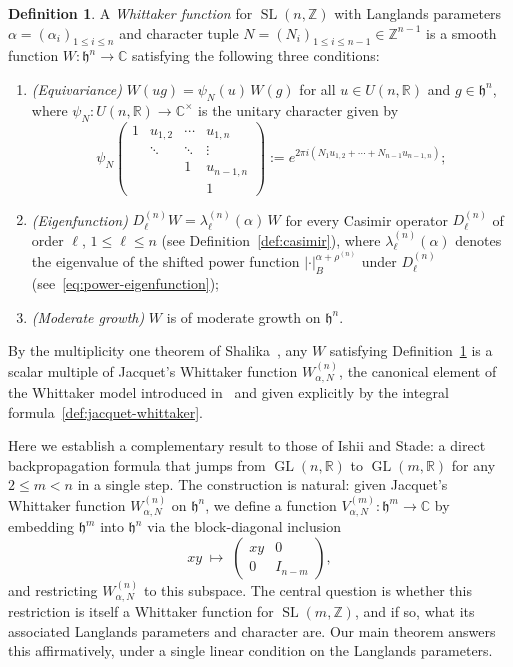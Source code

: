 \documentclass[12pt, reqno, oneside]{amsart}
\theoremstyle{definition}
\newtheorem{definition}[theorem]{Definition}
\numberwithin{equation}{section}
\newcommand{\Z}{\mathbb{Z}}
\newcommand{\R}{\mathbb{R}}
\newcommand{\C}{\mathbb{C}}
\newcommand{\hh}{\mathfrak{h}}
\DeclareMathOperator{\GL}{GL}
\DeclareMathOperator{\SL}{SL}
\begin{document}
\begin{definition}\label{def:whittaker-intro}
A \emph{Whittaker function} for
$\SL(n,\Z)$ with Langlands parameters $\alpha = (\alpha_i)_{1\leq i\leq
n}$ and character tuple $N=(N_i)_{1\leq i\leq n-1}\in\Z^{n-1}$ is a
smooth function $W:\hh^n\to\C$ satisfying the following three conditions:
\begin{enumerate}[label=(\arabic*)]
  \item \textit{(Equivariance)} $W(ug) = \psi_N(u)\,W(g)$ for all
    $u\in U(n,\R)$ and $g\in\hh^n$, where $\psi_N:U(n,\R)\to\C^\times$
    is the unitary character given by
    \[
      \psi_N\!\left(\begin{smallmatrix}
        1 & u_{1,2} & \cdots & u_{1,n} \\
        & \ddots & \ddots & \vdots \\
        & & 1 & u_{n-1,n} \\
        & & & 1
      \end{smallmatrix}\right)
      := e^{2\pi i(N_1 u_{1,2}+\cdots+N_{n-1}u_{n-1,n})};
    \]
  \item \textit{(Eigenfunction)} $D_\ell^{(n)} W = \lambda_\ell^{(n)}(\alpha)\,W$
    for every Casimir operator $D_\ell^{(n)}$ of order $\ell$,
    $1\leq\ell\leq n$ (see Definition~\ref{def:casimir}), where
    $\lambda_\ell^{(n)}(\alpha)$ denotes the eigenvalue of the shifted
    power function $|\cdot|_B^{\alpha+\rho^{(n)}}$ under $D_\ell^{(n)}$
    (see~\eqref{eq:power-eigenfunction});
  \item \textit{(Moderate growth)} $W$ is of moderate growth on $\hh^n$.
\end{enumerate}
\end{definition}
By the multiplicity one theorem of Shalika~\cite{Sha74}, any $W$ satisfying
Definition~\ref{def:whittaker-intro} is a scalar multiple of Jacquet's
Whittaker function $W_{\alpha,N}^{(n)}$, the canonical element of the
Whittaker model introduced in~\cite{Jac67} and given explicitly by the
integral formula~\eqref{def:jacquet-whittaker}.

Here we establish a complementary result to those of Ishii and
Stade: a direct backpropagation formula that jumps from $\GL(n,\R)$ to
$\GL(m,\R)$ for any $2\leq m<n$ in a single step. The construction is
natural: given Jacquet's Whittaker function $W_{\alpha,N}^{(n)}$ on
$\hh^n$, we define a function $V_{\alpha,N}^{(m)}:\hh^m\to\C$ by
embedding $\hh^m$ into $\hh^n$ via the block-diagonal inclusion
\[
  xy \;\longmapsto\; \begin{pmatrix} xy & 0 \\ 0 & I_{n-m} \end{pmatrix},
\]
and restricting $W_{\alpha,N}^{(n)}$ to this subspace. The central
question is whether this restriction is itself a Whittaker function for
$\SL(m,\Z)$, and if so, what its associated Langlands parameters and
character are. Our main theorem answers this affirmatively, under a single
linear condition on the Langlands parameters.
\end{document}
